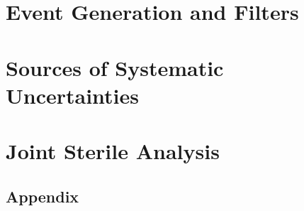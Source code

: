 \documentclass[
11pt, 
english, 
doublespacing, %
headsepline, %
usenames,dvipsnames
]{dissertation_class} %
\numberwithin{figure}{section}
\numberwithin{table}{section}
\numberwithin{equation}{section}
\begin{document}
\chapter{Event Generation and Filters}\label{chapter:gen}

%

\chapter{Sources of Systematic Uncertainties}\label{chapter:unc}



\chapter{Joint Sterile Analysis}\label{chapter:res}

% 

% 


\begin{appendices}

    \chapter{Appendix}\label{chapter:appendix}
    
    
\end{appendices}

\end{document}

